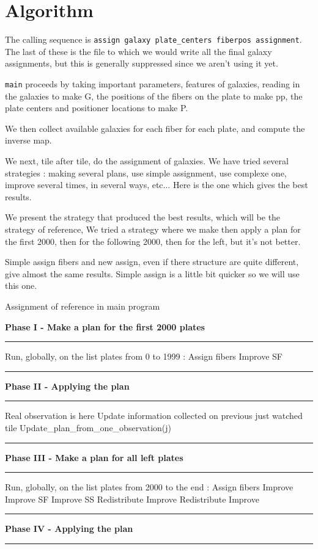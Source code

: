 \documentclass{extarticle}
\newcommand\Algphasee[1]{%
\Statex\hspace*{-\algorithmicindent}\textbf{#1}%
\vspace*{-.7\baselineskip}\Statex\hspace*{\dimexpr-\algorithmicindent-2pt\relax}\rule{\linewidth}{0.4pt}%
}
\newcommand\Algphase[1]{%
\vspace*{-.7\baselineskip}\Statex\hspace*{\dimexpr-\algorithmicindent-2pt\relax}\rule{\linewidth}{0.4pt}%
\Statex\hspace*{-\algorithmicindent}\textbf{#1}%
\vspace*{-.7\baselineskip}\Statex\hspace*{\dimexpr-\algorithmicindent-2pt\relax}\rule{\linewidth}{0.4pt}%
}
\begin{document}
\section{Algorithm}

The calling sequence is {\tt assign galaxy plate\_centers fiberpos assignment}. The last of these is the file to which we would write all the final galaxy assignments, but this is generally suppressed since we aren't using it yet.

 {\tt main} proceeds by taking important parameters, features of galaxies, reading in the galaxies to make G, the positions of the fibers on the plate to make pp, the plate centers and positioner locations to make P. 
 
We then collect available galaxies for each fiber for each plate, and compute the inverse map.
 
We next, tile after tile, do the assignment of galaxies. We have tried several strategies : making several plans, use simple assignment, use complexe one, improve several times, in several ways, etc... Here is the one which gives the best results.

We present the strategy that produced the best results, which will be the strategy of reference,
We tried a strategy where we make then apply a plan for the first 2000, then for the following 2000, then for the left, but it's not better.

Simple assign fibers and new assign, even if there structure are quite different, give almost the same results. Simple assign is a little bit quicker so we will use this one.

\begin{algorithm}[H]
	\caption{Assignment of reference in main program}\label{euclid}
	\begin{algorithmic}[1]
		\Algphasee{Phase I - Make a plan for the first 2000 plates}
		\State Run, globally, on the list plates from 0 to 1999 :
		\State Assign fibers
		\State Improve SF
	\end{algorithmic}
	\begin{algorithmic}[1]
		\Algphase{Phase II - Applying the plan}
		\State Real observation is here
		\State Update information collected on previous just watched tile
		\State Update\_plan\_from\_one\_observation(j)
		\EndFor
	\end{algorithmic}

	\begin{algorithmic}[1]
		\Algphase{Phase III - Make a plan for all left plates}
		\State Run, globally, on the list plates from 2000 to the end :
		\State Assign fibers
		\State Improve
		\State Improve SF
		\State Improve SS
		\State Redistribute
		\State Improve
		\State Redistribute
		\State Improve
	\end{algorithmic}

	\begin{algorithmic}[1]
		\Algphase{Phase IV - Applying the plan}
	\end{algorithmic}
\end{algorithm}
\end{document}
